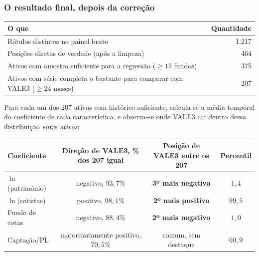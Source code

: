 \documentclass[11pt,a4paper]{article}
\begin{document}
\subsubsection*{O resultado final, depois da correção}

\begin{center}\small
\begin{tabular}{@{}lr@{}}
\toprule
O que & Quantidade \\
\midrule
Rótulos distintos no painel bruto & 1.217 \\
Posições diretas de verdade (após a limpeza) & 464 \\
Ativos com amostra suficiente para a regressão ($\geq15$ fundos) & 375 \\
Ativos com série completa o bastante para comparar com VALE3 ($\geq24$ meses) & 207 \\
\bottomrule
\end{tabular}
\end{center}

Para cada um dos 207 ativos com histórico suficiente, calcula-se a média temporal do coeficiente
de cada característica, e observa-se onde VALE3 cai dentro dessa distribuição \emph{entre
ativos}:

\begin{center}\scriptsize
\begin{tabular}{@{}lccc@{}}
\toprule
Coeficiente & Direção de VALE3, \% dos 207 igual & Posição de VALE3 entre os 207 & Percentil \\
\midrule
$\ln$(patrimônio) & negativo, $93{,}7\%$ & \textbf{3º mais negativo} & $1{,}4$ \\
$\ln$(cotistas)   & positivo, $98{,}1\%$ & \textbf{2º mais positivo} & $99{,}5$ \\
Fundo de cotas     & negativo, $88{,}4\%$ & \textbf{2º mais negativo} & $1{,}0$ \\
Captação/PL       & majoritariamente positivo, $70{,}5\%$ & comum, sem destaque & $60{,}9$ \\
\bottomrule
\end{tabular}
\end{center}
\end{document}
